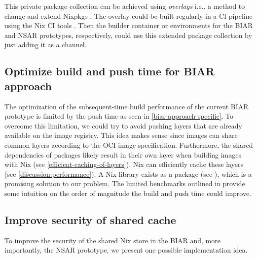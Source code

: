 This private package collection can be achieved using \emph{overlays} i.e., a method to change and extend Nixpkgs \cite{Overlays}. The overlay could be built regularly in a CI pipeline using the Nix CI tools \cite{Hydra}. Then the builder container or environments for the BIAR and NSAR prototypes, respectively, could use this extended package collection by just adding it as a channel.

\subsection{Optimize build and push time for BIAR approach}\label{optimize-build-and-push-BIAR}
The optimization of the subsequent-time build performance of the current BIAR prototype is limited by the push time as seen in \ref{biar-approach-specific}. To overcome this limitation, we could try to avoid pushing layers that are already available on the image registry. This idea makes sense since images can share common layers according to the OCI image specification. Furthermore, the shared dependencies of packages likely result in their own layer when building images with Nix (see \ref{efficient-caching-of-layers}). Nix can efficiently cache these layers (see \ref{discussion:performance}). A Nix library exists as a package (see \cite{Nix2Container}), which is a promising solution to our problem. The limited benchmarks outlined in \cite{Nix2Container} provide some intuition on the order of magnitude the build and push time could improve.


\subsection{Improve security of shared cache}\label{improve-shared-cache-security}
To improve the security of the shared Nix store in the BIAR and, more importantly, the NSAR prototype, we present one possible implementation idea. 

